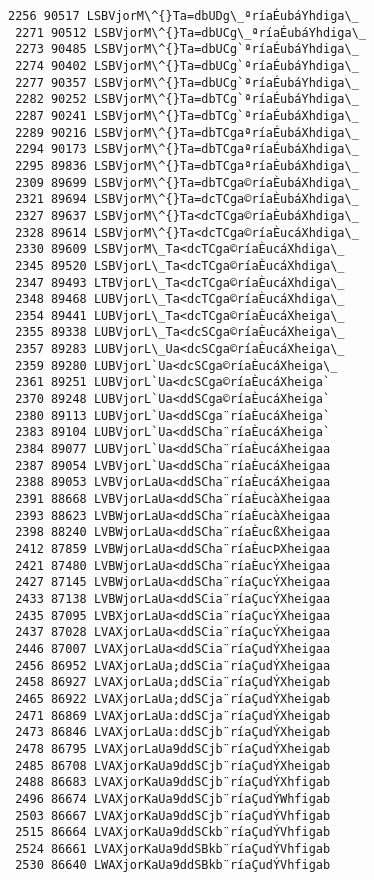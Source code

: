 \documentclass[11pt]{article}
\begin{document}
\begin{Verbatim}[commandchars=\\\{\}]
 2256 90517 LSBVjorM\^{}Ta=dbUDg\_ªríaÉubáYhdiga\_
 2271 90512 LSBVjorM\^{}Ta=dbUCg\_ªríaÉubáYhdiga\_
 2273 90485 LSBVjorM\^{}Ta=dbUCg`ªríaÉubáYhdiga\_
 2274 90402 LSBVjorM\^{}Ta=dbUCg`ªríaÉubáYhdiga\_
 2277 90357 LSBVjorM\^{}Ta=dbUCg`ªríaÉubáYhdiga\_
 2282 90252 LSBVjorM\^{}Ta=dbTCg`ªríaÉubáYhdiga\_
 2287 90241 LSBVjorM\^{}Ta=dbTCg`ªríaÉubáXhdiga\_
 2289 90216 LSBVjorM\^{}Ta=dbTCgaªríaÉubáXhdiga\_
 2294 90173 LSBVjorM\^{}Ta=dbTCgaªríaÉubáXhdiga\_
 2295 89836 LSBVjorM\^{}Ta=dbTCgaªríaÈubáXhdiga\_
 2309 89699 LSBVjorM\^{}Ta=dbTCga©ríaÈubáXhdiga\_
 2321 89694 LSBVjorM\^{}Ta=dcTCga©ríaÈubáXhdiga\_
 2327 89637 LSBVjorM\^{}Ta<dcTCga©ríaÈubáXhdiga\_
 2328 89614 LSBVjorM\^{}Ta<dcTCga©ríaÈucáXhdiga\_
 2330 89609 LSBVjorM\_Ta<dcTCga©ríaÈucáXhdiga\_
 2345 89520 LSBVjorL\_Ta<dcTCga©ríaÈucáXhdiga\_
 2347 89493 LTBVjorL\_Ta<dcTCga©ríaÈucáXhdiga\_
 2348 89468 LUBVjorL\_Ta<dcTCga©ríaÈucáXhdiga\_
 2354 89441 LUBVjorL\_Ta<dcTCga©ríaÈucáXheiga\_
 2355 89338 LUBVjorL\_Ta<dcSCga©ríaÈucáXheiga\_
 2357 89283 LUBVjorL\_Ua<dcSCga©ríaÈucáXheiga\_
 2359 89280 LUBVjorL`Ua<dcSCga©ríaÈucáXheiga\_
 2361 89251 LUBVjorL`Ua<dcSCga©ríaÈucáXheiga`
 2370 89248 LUBVjorL`Ua<ddSCga©ríaÈucáXheiga`
 2380 89113 LUBVjorL`Ua<ddSCga¨ríaÈucáXheiga`
 2383 89104 LUBVjorL`Ua<ddSCha¨ríaÈucáXheiga`
 2384 89077 LUBVjorL`Ua<ddSCha¨ríaÈucáXheigaa
 2387 89054 LVBVjorL`Ua<ddSCha¨ríaÈucáXheigaa
 2388 89053 LVBVjorLaUa<ddSCha¨ríaÈucáXheigaa
 2391 88668 LVBVjorLaUa<ddSCha¨ríaÈucàXheigaa
 2393 88623 LVBWjorLaUa<ddSCha¨ríaÈucàXheigaa
 2398 88240 LVBWjorLaUa<ddSCha¨ríaÈucßXheigaa
 2412 87859 LVBWjorLaUa<ddSCha¨ríaÈucÞXheigaa
 2421 87480 LVBWjorLaUa<ddSCha¨ríaÈucÝXheigaa
 2427 87145 LVBWjorLaUa<ddSCha¨ríaÇucÝXheigaa
 2433 87138 LVBWjorLaUa<ddSCia¨ríaÇucÝXheigaa
 2435 87095 LVBXjorLaUa<ddSCia¨ríaÇucÝXheigaa
 2437 87028 LVAXjorLaUa<ddSCia¨ríaÇucÝXheigaa
 2446 87007 LVAXjorLaUa<ddSCia¨ríaÇudÝXheigaa
 2456 86952 LVAXjorLaUa;ddSCia¨ríaÇudÝXheigaa
 2458 86927 LVAXjorLaUa;ddSCia¨ríaÇudÝXheigab
 2465 86922 LVAXjorLaUa;ddSCja¨ríaÇudÝXheigab
 2471 86869 LVAXjorLaUa:ddSCja¨ríaÇudÝXheigab
 2473 86846 LVAXjorLaUa:ddSCjb¨ríaÇudÝXheigab
 2478 86795 LVAXjorLaUa9ddSCjb¨ríaÇudÝXheigab
 2485 86708 LVAXjorKaUa9ddSCjb¨ríaÇudÝXheigab
 2488 86683 LVAXjorKaUa9ddSCjb¨ríaÇudÝXhfigab
 2496 86674 LVAXjorKaUa9ddSCjb¨ríaÇudÝWhfigab
 2503 86667 LVAXjorKaUa9ddSCjb¨ríaÇudÝVhfigab
 2515 86664 LVAXjorKaUa9ddSCkb¨ríaÇudÝVhfigab
 2524 86661 LVAXjorKaUa9ddSBkb¨ríaÇudÝVhfigab
 2530 86640 LWAXjorKaUa9ddSBkb¨ríaÇudÝVhfigab

\end{Verbatim}
\end{document}

